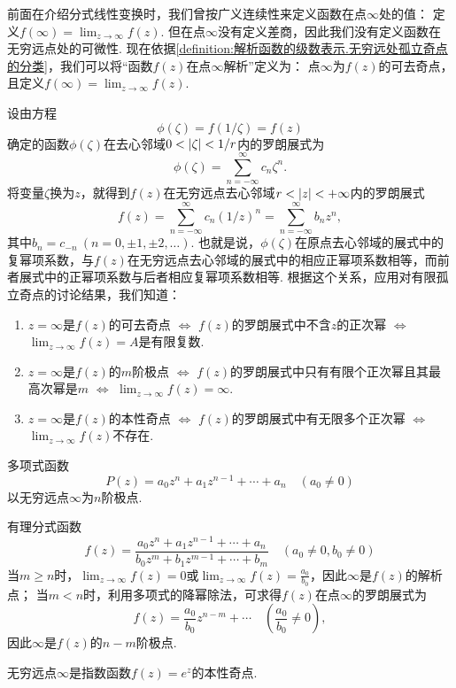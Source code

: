 前面在介绍分式线性变换时，我们曾按广义连续性来定义函数在点\(\infty\)处的值：
定义\(f(\infty) = \lim_{z\to\infty} f(z)\).
但在点\(\infty\)没有定义差商，因此我们没有定义函数在无穷远点处的可微性.
现在依据\cref{definition:解析函数的级数表示.无穷远处孤立奇点的分类}，我们可以将“函数\(f(z)\)在点\(\infty\)解析”定义为：
点\(\infty\)为\(f(z)\)的可去奇点，且定义\(f(\infty) = \lim_{z\to\infty} f(z)\).

设由方程\[
\phi(\zeta) = f(1/\zeta) = f(z)
\]确定的函数\(\phi(\zeta)\)在去心邻域\(0<\abs{\zeta}<1/r\)内的罗朗展式为\[
\phi(\zeta) = \sum_{n=-\infty}^\infty c_n \zeta^n.
\]将变量\(\zeta\)换为\(z\)，就得到\(f(z)\)在无穷远点去心邻域\(r<\abs{z}<+\infty\)内的罗朗展式\[
f(z) = \sum_{n=-\infty}^\infty c_n (1/z)^n
= \sum_{n=-\infty}^\infty b_n z^n,
\]其中\(b_n = c_{-n}\ (n=0,\pm1,\pm2,\dotsc)\).
也就是说，\(\phi(\zeta)\)在原点去心邻域的展式中的复幂项系数，与\(f(z)\)在无穷远点去心邻域的展式中的相应正幂项系数相等，而前者展式中的正幂项系数与后者相应复幂项系数相等.
根据这个关系，应用对有限孤立奇点的讨论结果，我们知道：
\begin{enumerate}
\item \(z=\infty\)是\(f(z)\)的可去奇点 \(\iff\) \(f(z)\)的罗朗展式中不含\(z\)的正次幂 \(\iff\) \(\lim_{z\to\infty} f(z) = A\)是有限复数.
\item \(z=\infty\)是\(f(z)\)的\(m\)阶极点 \(\iff\) \(f(z)\)的罗朗展式中只有有限个正次幂且其最高次幂是\(m\) \(\iff\) \(\lim_{z\to\infty} f(z) = \infty\).
\item \(z=\infty\)是\(f(z)\)的本性奇点 \(\iff\) \(f(z)\)的罗朗展式中有无限多个正次幂 \(\iff\) \(\lim_{z\to\infty} f(z)\)不存在.
\end{enumerate}

\begin{example}
多项式函数\[
P(z) = a_0 z^n + a_1 z^{n-1} + \dotsb + a_n
\quad(a_0\neq0)
\]以无穷远点\(\infty\)为\(n\)阶极点.
\end{example}

\begin{example}
有理分式函数\[
f(z) = \frac{a_0 z^n + a_1 z^{n-1} + \dotsb + a_n}{b_0 z^m + b_1 z^{m-1} + \dotsb + b_m}
\quad(a_0\neq0,b_0\neq0)
\]当\(m \geq n\)时，\(\lim_{z\to\infty} f(z) = 0\)或\(\lim_{z\to\infty} f(z) = \frac{a_0}{b_0}\)，因此\(\infty\)是\(f(z)\)的解析点；
当\(m<n\)时，利用多项式的降幂除法，可求得\(f(z)\)在点\(\infty\)的罗朗展式为\[
f(z) = \frac{a_0}{b_0} z^{n-m} + \dotsb
\quad(\frac{a_0}{b_0}\neq0),
\]因此\(\infty\)是\(f(z)\)的\(n-m\)阶极点.
\end{example}

\begin{example}
无穷远点\(\infty\)是指数函数\(f(z) = e^z\)的本性奇点.
\end{example}
